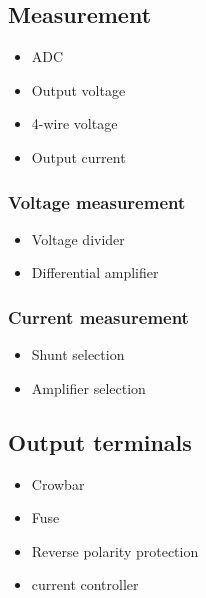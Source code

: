 \FloatBarrier

\subsection{Measurement}
\label{sec_meas}
\begin{itemize}
    \item ADC
    \item Output voltage
    \item 4-wire voltage
    \item Output current
\end{itemize}

\subsubsection{Voltage measurement}
\label{sec_volt_meas}
\begin{itemize}
    \item Voltage divider
    \item Differential amplifier
\end{itemize}

\FloatBarrier

\subsubsection{Current measurement}
\label{sec_cur_meas}
\begin{itemize}
    \item Shunt selection
    \item Amplifier selection
\end{itemize}

\FloatBarrier

\subsection{Output terminals}
\label{sec_out_term}
\begin{itemize}
    \item Crowbar
    \item Fuse
    \item Reverse polarity protection
    \item current controller
\end{itemize}

\FloatBarrier

